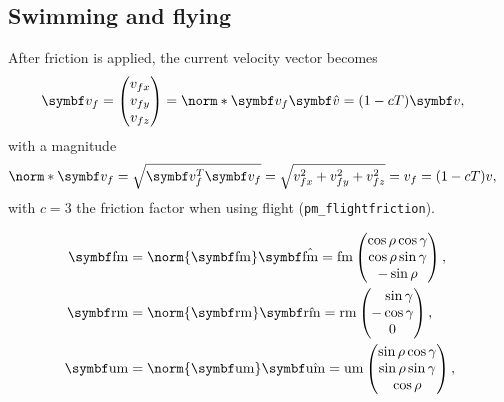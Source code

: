 \subsection{Swimming and flying}
\label{sec:swim_and_flying}
After friction is applied, the current velocity vector becomes
\begin{align*}
\vec{v}_f &=
\begin{pmatrix}
v_{fx} \\ v_{fy} \\ v_{fz}
\end{pmatrix} = \norm*{\vec{v}_f} \uvec{v} = (1-cT)\vec{v},
\end{align*}
with a magnitude
\begin{align*}
\norm*{\vec{v}_f} &= \sqrt{\vec{v}_f^T \vec{v}_f} = \sqrt{v_{fx}^2 + v_{fy}^2 + v_{fz}^2} = v_f = (1-cT)v,
\end{align*}
with $c = 3$ the friction factor when using flight (\texttt{pm\_flightfriction}).

\begin{align*}
\vec{\fmove} &= \norm{\vec{\fmove}} \uvec{\fmove} = \fmove
\begin{pmatrix}
\cos\rho\cos\gamma \\ \cos\rho\sin\gamma \\ -\sin\rho
\end{pmatrix},\\
%
\vec{\rmove} &= \norm{\vec{\rmove}} \uvec{\rmove} = \rmove
\begin{pmatrix}
\hphantom{-}\sin\gamma \\ -\cos\gamma \\ 0
\end{pmatrix},\\
%
\vec{\umove} &= \norm{\vec{\umove}} \uvec{\umove} = \umove
\begin{pmatrix}
\sin\rho\cos\gamma \\ \sin\rho\sin\gamma \\ \cos\rho
\end{pmatrix},
\end{align*}

